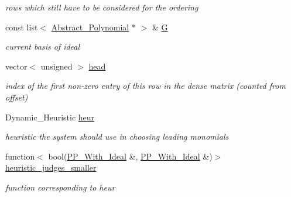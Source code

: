 \begin{DoxyCompactItemize}
\begin{DoxyCompactList}\small\item\em rows which still have to be considered for the ordering \end{DoxyCompactList}\item 
\mbox{\label{group___g_b_computation_a3dbc8c690c4a21ba195ae32c19982f79}} 
const list$<$ \hyperlink{group__polygroup_class_abstract___polynomial}{Abstract\+\_\+\+Polynomial} $\ast$ $>$ \& \hyperlink{group___g_b_computation_a3dbc8c690c4a21ba195ae32c19982f79}{G}
\begin{DoxyCompactList}\small\item\em current basis of ideal \end{DoxyCompactList}\item 
\mbox{\label{group___g_b_computation_a1679f8bda319a602672bc866220bb7fb}} 
vector$<$ unsigned $>$ \hyperlink{group___g_b_computation_a1679f8bda319a602672bc866220bb7fb}{head}
\begin{DoxyCompactList}\small\item\em index of the first non-\/zero entry of this row in the dense matrix (counted from offset) \end{DoxyCompactList}\item 
\mbox{\label{group___g_b_computation_a31a62db75649e409aa5b9f374c260ba5}} 
Dynamic\+\_\+\+Heuristic \hyperlink{group___g_b_computation_a31a62db75649e409aa5b9f374c260ba5}{heur}
\begin{DoxyCompactList}\small\item\em heuristic the system should use in choosing leading monomials \end{DoxyCompactList}\item 
\mbox{\label{group___g_b_computation_afccb03cc2471080d322e6b68f763e24b}} 
function$<$ bool(\hyperlink{group___g_b_computation_class_dynamic___engine_1_1_p_p___with___ideal}{P\+P\+\_\+\+With\+\_\+\+Ideal} \&, \hyperlink{group___g_b_computation_class_dynamic___engine_1_1_p_p___with___ideal}{P\+P\+\_\+\+With\+\_\+\+Ideal} \&)$>$ \hyperlink{group___g_b_computation_afccb03cc2471080d322e6b68f763e24b}{heuristic\+\_\+judges\+\_\+smaller}
\begin{DoxyCompactList}\small\item\em function corresponding to {\ttfamily heur} \end{DoxyCompactList}\item 

\end{DoxyCompactItemize}
